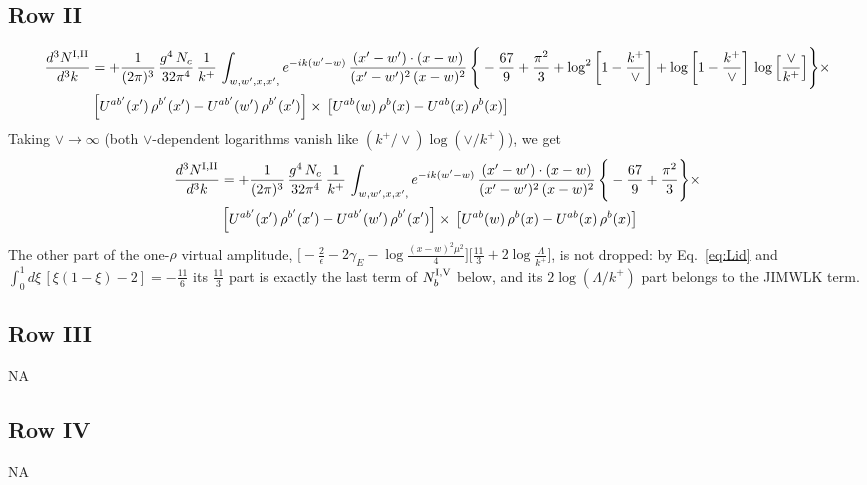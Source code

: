 \documentclass[9pt]{article}
\numberwithin{equation}{section}
\begin{document}
\subsection{Row II}
\begin{align}
     \frac{d^{3}N^{\rm I,II}}{d^{3}k} &  =  +\frac{1}{(2\pi)^{3}}\, \frac{g^{4}\,N_{c}}{32\pi^{4}}\,\frac{1}{k^{+}}\, \int_{w, w',x,x',} e^{-ik(w^\prime-w)}\, \frac{(x'-w')\cdot (x-w)}{(x'-w')^{2}\, (x-w)^{2}}\, \Bigg\{ -\frac{67}{9}+\frac{\pi^{2}}{3}+\log^{2}{\left[1-\frac{k^{+}}{\vee}\right]}+\log{\left[1-\frac{k^{+}}{\vee}\right]}\,\log{\left[\frac{\vee}{k^{+}}\right]}\Bigg\}\times\notag \\ & \left[U^{ab'}(x')\,\rho^{b'}(x') - U^{ab'}(w')\,\rho^{b'}(x')\right]\times\,\left[U^{ab}(w)\,\rho^{b}(x) - U^{ab}(x)\,\rho^{b}(x)\right]
\end{align}  
Taking $\vee\to \infty$ (both $\vee$-dependent logarithms vanish like $(k^{+}/\vee)\log(\vee/k^{+})$), we get
\begin{align}
     \frac{d^{3}N^{\rm I,II}}{d^{3}k} &  =  +\frac{1}{(2\pi)^{3}}\, \frac{g^{4}\,N_{c}}{32\pi^{4}}\,\frac{1}{k^{+}}\, \int_{w, w',x,x',} e^{-ik(w^\prime-w)}\, \frac{(x'-w')\cdot (x-w)}{(x'-w')^{2}\, (x-w)^{2}}\, \Bigg\{ -\frac{67}{9}+\frac{\pi^{2}}{3}\Bigg\}\times\notag \\ & \left[U^{ab'}(x')\,\rho^{b'}(x') - U^{ab'}(w')\,\rho^{b'}(x')\right]\times\,\left[U^{ab}(w)\,\rho^{b}(x) - U^{ab}(x)\,\rho^{b}(x)\right]
\end{align}  
The other part of the one-$\rho$ virtual amplitude, $\big[-\tfrac{2}{\epsilon}-2\gamma_{E}-\log\tfrac{(x-w)^{2}\mu^{2}}{4}\big]\big[\tfrac{11}{3}+2\log\tfrac{\Lambda}{k^{+}}\big]$, is not dropped: by Eq.~\eqref{eq:Lid} and $\int_{0}^{1}d\xi\,[\xi(1-\xi)-2]=-\tfrac{11}{6}$ its $\tfrac{11}{3}$ part is exactly the last term of $N^{\rm I,V}_{b}$ below, and its $2\log(\Lambda/k^{+})$ part belongs to the JIMWLK term.
\subsection{Row III}
\textsc{NA}
\subsection{Row IV}
\textsc{NA}
\end{document}
